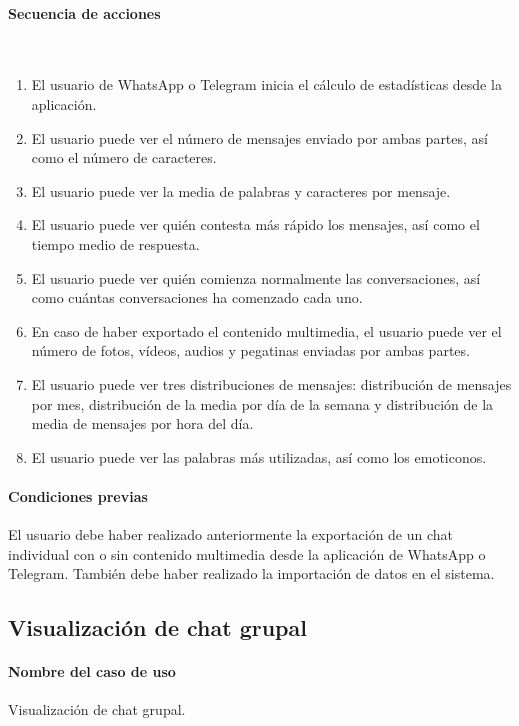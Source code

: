 \paragraph{Secuencia de acciones}\mbox{}\\

\begin{enumerate}
	\item El usuario de WhatsApp o Telegram inicia el cálculo de estadísticas desde la aplicación.
	\item El usuario puede ver el número de mensajes enviado por ambas partes, así como el número de caracteres.
	\item El usuario puede ver la media de palabras y caracteres por mensaje.
	\item El usuario puede ver quién contesta más rápido los mensajes, así como el tiempo medio de respuesta.
	\item El usuario puede ver quién comienza normalmente las conversaciones, así como cuántas conversaciones ha comenzado cada uno.
	\item En caso de haber exportado el contenido multimedia, el usuario puede ver el número de fotos, vídeos, audios y pegatinas enviadas por ambas partes.
	\item El usuario puede ver tres distribuciones de mensajes: distribución de mensajes por mes, distribución de la media por día de la semana y distribución de la media de mensajes por hora del día.
	\item El usuario puede ver las palabras más utilizadas, así como los emoticonos.
\end{enumerate}

\paragraph{Condiciones previas} El usuario debe haber realizado anteriormente la exportación de un chat individual con o sin contenido multimedia desde la aplicación de WhatsApp o Telegram. También debe haber realizado la importación de datos en el sistema.

\subsection{Visualización de chat grupal}

\paragraph{Nombre del caso de uso} Visualización de chat grupal.
